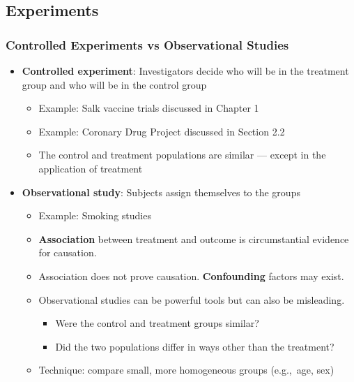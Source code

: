 \documentclass[t,xcolor=pst,dvips]{beamer}
\begin{document}
\subsection{Experiments}
\begin{frame}[t]\frametitle{Controlled Experiments vs Observational Studies}
{\small 
\begin{itemize}
\item \textbf{Controlled experiment}: Investigators decide who will be in the treatment group and who will 
  be in the control group
     \begin{itemize}
     \item Example:  Salk vaccine trials discussed in Chapter 1
     \item Example:  Coronary Drug Project discussed in Section 2.2
     \item The control and treatment populations are similar --- except in the application of treatment
     \end{itemize}
\item \textbf{Observational study}: Subjects assign themselves to the groups
     \begin{itemize}
     \item Example:  Smoking studies
     \item \textbf{Association} between treatment and outcome is circumstantial evidence for causation.    
     \item Association does not prove causation.  \textbf{Confounding} factors may exist.
     \item Observational studies can be powerful tools but can also be misleading.%
       \begin{itemize}
         \item Were the control and treatment groups similar?
         \item Did the two populations differ in ways other than the treatment?
       \end{itemize}
     \item Technique:  compare small, more homogeneous groups (e.g.,~age, sex)
     \end{itemize}
\end{itemize}}
\end{frame}
\end{document}

